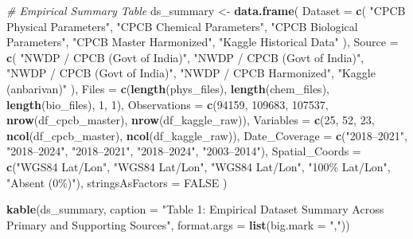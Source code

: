 \documentclass[
]{article}
\newenvironment{Shaded}{\begin{snugshade}}{\end{snugshade}}
\newcommand{\AttributeTok}[1]{\textcolor[rgb]{0.13,0.29,0.53}{#1}}
\newcommand{\CommentTok}[1]{\textcolor[rgb]{0.56,0.35,0.01}{\textit{#1}}}
\newcommand{\ConstantTok}[1]{\textcolor[rgb]{0.56,0.35,0.01}{#1}}
\newcommand{\DecValTok}[1]{\textcolor[rgb]{0.00,0.00,0.81}{#1}}
\newcommand{\FunctionTok}[1]{\textcolor[rgb]{0.13,0.29,0.53}{\textbf{#1}}}
\newcommand{\NormalTok}[1]{#1}
\newcommand{\OtherTok}[1]{\textcolor[rgb]{0.56,0.35,0.01}{#1}}
\newcommand{\StringTok}[1]{\textcolor[rgb]{0.31,0.60,0.02}{#1}}
\begin{document}
\begin{Shaded}
\begin{Highlighting}[]
\CommentTok{\# Empirical Summary Table}
\NormalTok{ds\_summary }\OtherTok{\textless{}{-}} \FunctionTok{data.frame}\NormalTok{(}
  \AttributeTok{Dataset =} \FunctionTok{c}\NormalTok{(}
    \StringTok{"CPCB Physical Parameters"}\NormalTok{,}
    \StringTok{"CPCB Chemical Parameters"}\NormalTok{,}
    \StringTok{"CPCB Biological Parameters"}\NormalTok{,}
    \StringTok{"CPCB Master Harmonized"}\NormalTok{,}
    \StringTok{"Kaggle Historical Data"}
\NormalTok{  ),}
  \AttributeTok{Source =} \FunctionTok{c}\NormalTok{(}
    \StringTok{"NWDP / CPCB (Govt of India)"}\NormalTok{,}
    \StringTok{"NWDP / CPCB (Govt of India)"}\NormalTok{,}
    \StringTok{"NWDP / CPCB (Govt of India)"}\NormalTok{,}
    \StringTok{"NWDP / CPCB Harmonized"}\NormalTok{,}
    \StringTok{"Kaggle (anbarivan)"}
\NormalTok{  ),}
  \AttributeTok{Files =} \FunctionTok{c}\NormalTok{(}\FunctionTok{length}\NormalTok{(phys\_files), }\FunctionTok{length}\NormalTok{(chem\_files), }\FunctionTok{length}\NormalTok{(bio\_files), }\DecValTok{1}\NormalTok{, }\DecValTok{1}\NormalTok{),}
  \AttributeTok{Observations =} \FunctionTok{c}\NormalTok{(}\DecValTok{94159}\NormalTok{, }\DecValTok{109683}\NormalTok{, }\DecValTok{107537}\NormalTok{, }\FunctionTok{nrow}\NormalTok{(df\_cpcb\_master), }\FunctionTok{nrow}\NormalTok{(df\_kaggle\_raw)),}
  \AttributeTok{Variables =} \FunctionTok{c}\NormalTok{(}\DecValTok{25}\NormalTok{, }\DecValTok{52}\NormalTok{, }\DecValTok{23}\NormalTok{, }\FunctionTok{ncol}\NormalTok{(df\_cpcb\_master), }\FunctionTok{ncol}\NormalTok{(df\_kaggle\_raw)),}
  \AttributeTok{Date\_Coverage =} \FunctionTok{c}\NormalTok{(}\StringTok{"2018–2021"}\NormalTok{, }\StringTok{"2018–2024"}\NormalTok{, }\StringTok{"2018–2021"}\NormalTok{, }\StringTok{"2018–2024"}\NormalTok{, }\StringTok{"2003–2014"}\NormalTok{),}
  \AttributeTok{Spatial\_Coords =} \FunctionTok{c}\NormalTok{(}\StringTok{"WGS84 Lat/Lon"}\NormalTok{, }\StringTok{"WGS84 Lat/Lon"}\NormalTok{, }\StringTok{"WGS84 Lat/Lon"}\NormalTok{, }\StringTok{"100\% Lat/Lon"}\NormalTok{, }\StringTok{"Absent (0\%)"}\NormalTok{),}
  \AttributeTok{stringsAsFactors =} \ConstantTok{FALSE}
\NormalTok{)}

\FunctionTok{kable}\NormalTok{(ds\_summary, }\AttributeTok{caption =} \StringTok{"Table 1: Empirical Dataset Summary Across Primary and Supporting Sources"}\NormalTok{,}
      \AttributeTok{format.args =} \FunctionTok{list}\NormalTok{(}\AttributeTok{big.mark =} \StringTok{","}\NormalTok{))}
\end{Highlighting}
\end{Shaded}
\end{document}
